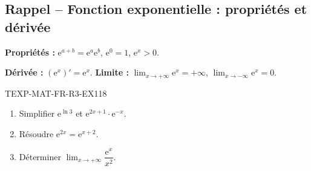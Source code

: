 

\subsection*{Rappel -- Fonction exponentielle : propriétés et dérivée}

\textbf{Propriétés :} $\mathrm{e}^{a+b} = \mathrm{e}^a \mathrm{e}^b$, $\mathrm{e}^0 = 1$, $\mathrm{e}^x > 0$.

\textbf{Dérivée :} $(\mathrm{e}^x)' = \mathrm{e}^x$. \textbf{Limite :} $\lim_{x \to +\infty} \mathrm{e}^x = +\infty$, $\lim_{x \to -\infty} \mathrm{e}^x = 0$.

\begin{exercice}{TEXP-MAT-FR-R3-EX1}{1}{8}
\begin{enumerate}
  \item Simplifier $\mathrm{e}^{\ln 3}$ et $\mathrm{e}^{2x + 1} \cdot \mathrm{e}^{-x}$.
  \item Résoudre $\mathrm{e}^{2x} = \mathrm{e}^{x+2}$.
  \item Déterminer $\lim_{x \to +\infty} \dfrac{\mathrm{e}^x}{x^2}$.
\end{enumerate}
\end{exercice}

